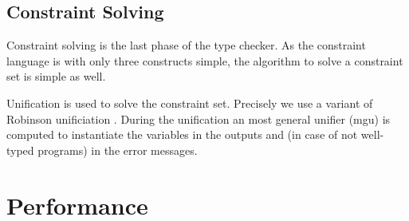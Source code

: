 \subsection{Constraint Solving}
\label{sec:constraint-solving}
Constraint solving is the last phase of the type checker. As the
constraint language is with only three constructs simple, the
algorithm to solve a constraint set is simple as well.

Unification is used to solve the constraint set. Precisely we use a
variant of Robinson unificiation . During the
unification an most general unifier (mgu) is computed to instantiate
the variables in the outputs and (in case of not well-typed programs)
in the error messages.
\section{Performance}
\label{sec:performance}


